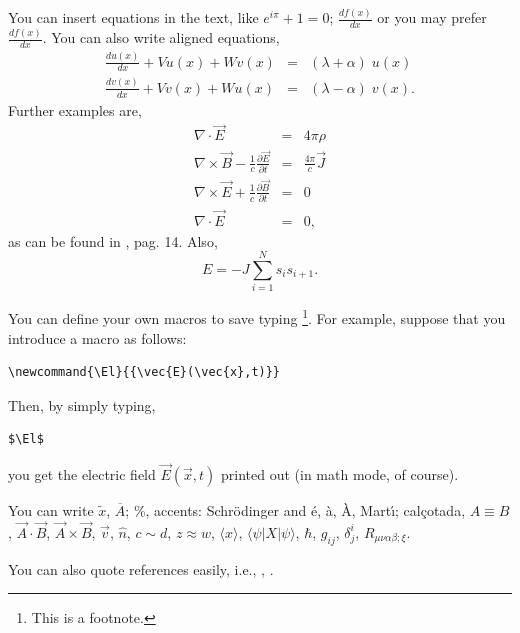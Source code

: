 \documentclass[twocolumn]{revtex4}
\begin{document}
You can insert equations in the text, like $e^{i \pi} +1=0$;
$\frac{df(x)}{dx}$ or you may prefer
$\displaystyle \frac{df(x)}{dx}$.
You can also write aligned equations,
\begin{eqnarray}
\frac{du(x)}{dx}+V u(x) +W v(x) &=& (\lambda + \alpha)  \; u(x) \nonumber \\
\frac{dv(x)}{dx}+V v(x) +W u(x) &=& (\lambda - \alpha) \; v(x).
\label{eq:tercera}\end{eqnarray}
Further examples are,
\begin{eqnarray}
\nabla {\cdot} \vec{E}&=& 4 \pi \rho \nonumber \\
\nabla \times \vec{B} - \frac{1}{c} \frac{\partial \vec{E}}{\partial t} &=&
\frac{4 \pi}{c} \vec{J} \nonumber \\
\nabla \times \vec{E} +\frac{1}{c} \frac{\partial \vec{B}}{\partial t} &=&
0 \nonumber \\
\nabla {\cdot} \vec{E}&=& 0,
\label{maxwell}
\end{eqnarray}
as can be found in \cite{jackson}, pag. 14. Also,
\begin{equation}
E = -J \sum_{i=1}^N s_i s_{i+1}.
\label{eq:ising}
\end{equation}

You can define your own macros to save typing
\footnote{This is a footnote.}.
For example, suppose
that you introduce a macro as follows:
\newcommand{\El}{{\vec{E}(\vec{x},t)}}
\begin{verbatim}
\newcommand{\El}{{\vec{E}(\vec{x},t)}}
\end{verbatim}
Then, by simply typing,
\begin{verbatim}
$\El$
\end{verbatim}
you get the electric field $\El$ printed out (in math mode, of course).

\vspace*{0.5cm}
You can write $\tilde x$,
$\overline{A}$; \%, accents: Schr\"odinger
and \'e, \`a, \`A, Mart\'{\i}; cal\c cotada,
$A \equiv B $, $\vec{A}\cdot\vec{B}$, $\vec{A} \times \vec{B}$,
$\vec{v}$, $\hat{n}$,
$c \sim d$, $z \approx w$, $\langle x \rangle$,
$\langle \psi | X | \psi \rangle$, $\hbar$, $g_{ij}$, $\delta^i_j$,
$R_{\mu \nu \alpha \beta ; \xi}$.

\vspace*{0.5cm}
You can also quote references easily, i.e., \cite{wmap}, \cite{weinberg}.
\end{document}
